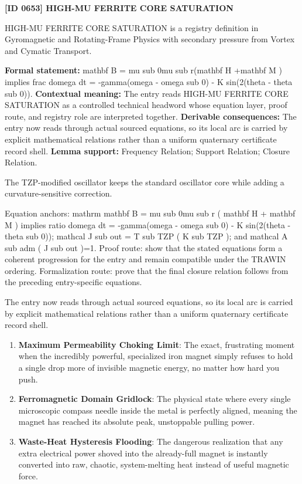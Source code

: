\clearpage
\noindent\textbf{[ID 0653] HIGH-MU FERRITE CORE SATURATION}\par
\vspace{0.35em}
\begingroup\small
{}
HIGH-MU FERRITE CORE SATURATION is a registry definition in Gyromagnetic and Rotating-Frame Physics with secondary pressure from Vortex and Cymatic Transport.

\begingroup\footnotesize\setlength{\emergencystretch}{3em}\sloppy
\textbf{Formal statement:} mathbf B = mu sub 0mu sub r(mathbf H +mathbf M ) implies frac domega dt = -gamma(omega - omega sub 0) - K sin(2(theta - theta sub 0)). \textbf{Contextual meaning:} The entry reads HIGH-MU FERRITE CORE SATURATION as a controlled technical headword whose equation layer, proof route, and registry role are interpreted together. \textbf{Derivable consequences:} The entry now reads through actual sourced equations, so its local arc is carried by explicit mathematical relations rather than a uniform quaternary certificate record shell. \textbf{Lemma support:} Frequency Relation; Support Relation; Closure Relation.\par
\endgroup

The TZP-modified oscillator keeps the standard oscillator core while adding a curvature-sensitive correction.

Equation anchors: mathrm mathbf B = mu sub 0mu sub r ( mathbf H + mathbf M ) implies ratio domega dt = -gamma(omega - omega sub 0) - K sin(2(theta - theta sub 0)); mathcal J sub out = T sub TZP ( K sub TZP ); and mathcal A sub adm ( J sub out )=1. Proof route: show that the stated equations form a coherent progression for the entry and remain compatible under the TRAWIN ordering. Formalization route: prove that the final closure relation follows from the preceding entry-specific equations.

The entry now reads through actual sourced equations, so its local arc is carried by explicit mathematical relations rather than a uniform quaternary certificate record shell.
\endgroup

\begin{enumerate}[leftmargin=1.6em,itemsep=6pt,topsep=4pt]
\item \textbf{Maximum Permeability Choking Limit}: The exact, frustrating moment when the incredibly powerful, specialized iron magnet simply refuses to hold a single drop more of invisible magnetic energy, no matter how hard you push.
\item \textbf{Ferromagnetic Domain Gridlock}: The physical state where every single microscopic compass needle inside the metal is perfectly aligned, meaning the magnet has reached its absolute peak, unstoppable pulling power.
\item \textbf{Waste-Heat Hysteresis Flooding}: The dangerous realization that any extra electrical power shoved into the already-full magnet is instantly converted into raw, chaotic, system-melting heat instead of useful magnetic force.
\end{enumerate}

